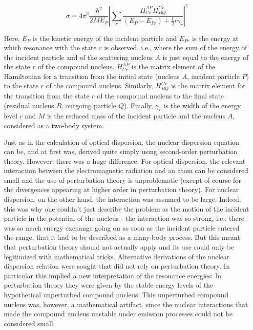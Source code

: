 \documentclass[12pt,a4paper]{article}
\begin{document}
\begin{equation}
\sigma = 4 \pi^3 \frac{\hbar^2}{2 M E_P} \left\vert \sum_r \frac{H^{AP}_{Cr} H^{Cr}_{BQ}}{(E_P - E_{Pr}) + \frac{1}{2} i \gamma_r} \right\vert^2
\end{equation}

Here, $E_P$ is the kinetic energy of the incident particle and $E_{Pr}$ is the energy at which resonance with the state $r$ is observed, i.e., where the sum of the energy of the incident particle and of the scattering nucleus $A$ is just equal to the energy of the state $r$ of the compound nucleus. $H^{AP}_{Cr}$ is the matrix element of the Hamiltonian for a transition from the initial state (nucleus $A$, incident particle $P$) to the state $r$ of the compound nucleus. Similarly, $H^{Cr}_{BQ}$ is the matrix element for the transition from the state $r$ of the compound nucleus to the final state (residual nucleus $B$, outgoing particle $Q$). Finally, $\gamma_r$ is the width of the energy level $r$ and $M$ is the reduced mass of the incident particle and the nucleus $A$, considered as a two-body system.

Just as in the calculation of optical dispersion, the nuclear dispersion equation can be, and at first was, derived quite simply using second-order perturbation theory. However, there was a huge difference. For optical dispersion, the relevant interaction between the electromagnetic radiation and an atom can be considered small and the use of perturbation theory is unproblematic (except of course for the divergences appearing at higher order in perturbation theory). For nuclear dispersion, on the other hand, the interaction was assumed to be large. Indeed, this was why one couldn't just describe the problem as the motion of the incident particle in the potential of the nucleus - the interaction was so strong, i.e., there was so much energy exchange going on as soon as the incident particle entered the range, that it had to be described as a many-body process. But this meant that perturbation theory should not actually apply and its use could only be legitimized with mathematical tricks. Alternative derivations of the nuclear dispersion relation were sought that did not rely on perturbation theory. In particular this implied a new interpretation of the resonance energies: In perturbation theory they were given by the stable energy levels of the hypothetical unperturbed compound nucleus. This unperturbed compound nucleus was, however, a mathematical artifact, since the nuclear interactions that made the compound nucleus unstable under emission processes could not be considered small.
\end{document}
